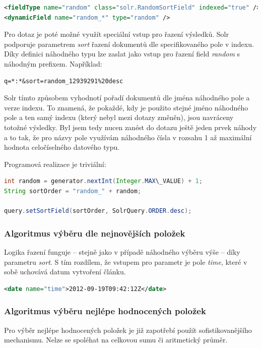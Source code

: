 \documentclass[thesis=M,czech]{FITthesis}[2014/05/07]
\begin{document}
\begin{lstlisting}[language=xml]
<fieldType name="random" class="solr.RandomSortField" indexed="true" />
<dynamicField name="random_*" type="random" />
\end{lstlisting}

Pro dotaz je poté možné využít speciální vstup pro řazení výsledků. Solr podporuje parametrem \emph{sort} řazení dokumentů dle specifikovaného pole v indexu. Díky definici náhodného typu lze zaslat jako vstup pro řazení field \emph{random} s náhodným prefixem. Například:

\begin{verbatim}
q=*:*&sort=random_12939291%20desc
\end{verbatim}

Solr tímto způsobem vyhodnotí pořadí dokumentů dle jména náhodného pole a verze indexu. To znamená, že pokaždé, kdy je použito stejné jméno náhodného pole a ten samý indexu (který nebyl mezi dotazy změněn), jsou navráceny totožné výsledky. Byl jsem tedy nucen zanést do dotazu ještě jeden prvek náhody a to tak, že pro názvy pole využívám náhodného čísla v rozsahu 1 až maximální hodnota celočíselného datového typu.

Programová realizace je triviální:

\begin{lstlisting}[language=java]
int random = generator.nextInt(Integer.MAX\_VALUE) + 1;
String sortOrder = "random_" + random;
  
query.setSortField(sortOrder, SolrQuery.ORDER.desc);
\end{lstlisting}       

\subsubsection{Algoritmus výběru dle nejnovějších položek}
Logika řazení funguje – stejně jako v případě náhodného výběru výše – díky parametru \emph{sort}. S tím rozdílem, že vstupem pro parametr je pole \emph{time}, které v sobě uchovává datum vytvoření článku.

\begin{lstlisting}[language=xml]
<date name="time">2012-09-19T09:42:12Z</date>
\end{lstlisting}

\subsubsection{Algoritmus výběru nejlépe hodnocených položek}
Pro výběr nejlépe hodnocených položek je již zapotřebí použít sofistikovanějšího mechanismu. Nelze se spoléhat na celkovou sumu či aritmetický průměr.
\end{document}

